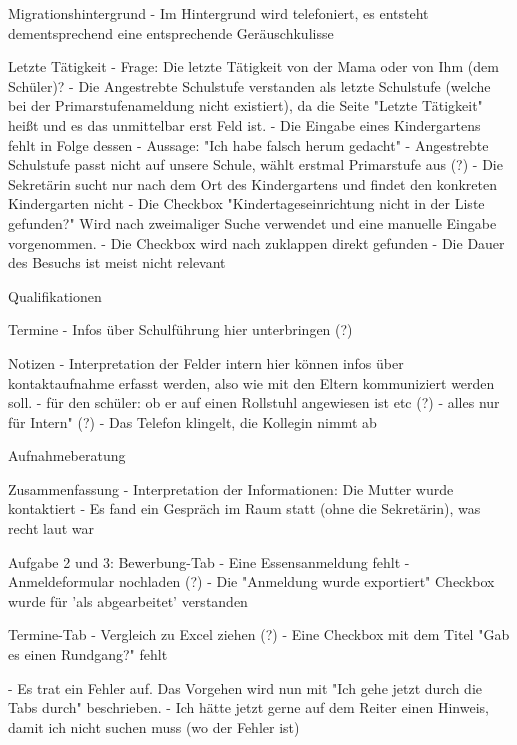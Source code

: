 Migrationshintergrund
- Im Hintergrund wird telefoniert, es entsteht dementsprechend eine entsprechende Geräuschkulisse














Letzte Tätigkeit
- Frage: Die letzte Tätigkeit von der Mama oder von Ihm (dem Schüler)?
- Die Angestrebte Schulstufe verstanden als letzte Schulstufe (welche bei der Primarstufenameldung nicht existiert), da die Seite "Letzte Tätigkeit" heißt und es das unmittelbar erst Feld ist.
 - Die Eingabe eines Kindergartens fehlt in Folge dessen
 - Aussage: "Ich habe falsch herum gedacht"
- Angestrebte Schulstufe passt nicht auf unsere Schule, wählt erstmal Primarstufe aus (?)
- Die Sekretärin sucht nur nach dem Ort des Kindergartens und findet den konkreten Kindergarten nicht
- Die Checkbox "Kindertageseinrichtung nicht in der Liste gefunden?" Wird nach zweimaliger Suche verwendet und eine manuelle Eingabe vorgenommen.
 - Die Checkbox wird nach zuklappen direkt gefunden
- Die Dauer des Besuchs ist meist nicht relevant

Qualifikationen			
 
Termine
- Infos über Schulführung hier unterbringen (?)

Notizen 
- Interpretation der Felder intern hier können infos über kontaktaufnahme erfasst werden, also wie mit den Eltern kommuniziert werden soll.
- für den schüler: ob er auf einen Rollstuhl angewiesen ist etc (?)
- alles nur für Intern"	 (?)
- Das Telefon klingelt, die Kollegin nimmt ab

Aufnahmeberatung							

Zusammenfassung		
- Interpretation der Informationen: Die Mutter wurde kontaktiert
- Es fand ein Gespräch im Raum statt (ohne die Sekretärin), was recht laut war

Aufgabe 2 und 3:
Bewerbung-Tab 
- Eine Essensanmeldung fehlt
- Anmeldeformular nochladen  (?)
- Die "Anmeldung wurde exportiert" Checkbox wurde für 'als abgearbeitet' verstanden

Termine-Tab
- Vergleich zu Excel ziehen (?)
- Eine Checkbox mit dem Titel "Gab es einen Rundgang?" fehlt

- Es trat ein Fehler auf. Das Vorgehen wird nun mit "Ich gehe jetzt durch die Tabs durch" beschrieben.
- Ich hätte jetzt gerne auf dem Reiter einen Hinweis, damit ich nicht suchen muss (wo der Fehler ist)

